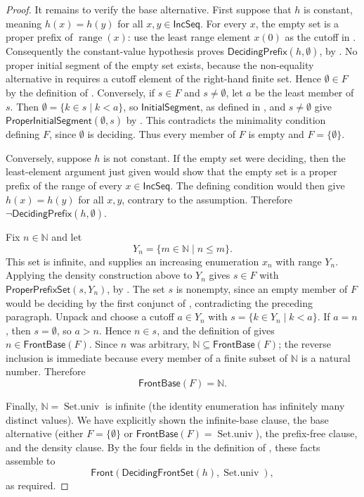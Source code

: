 \begin{proof}
It remains to verify the base alternative.  First suppose that $h$ is
constant, meaning $h(x)=h(y)$ for all $x,y\in\mathsf{IncSeq}$.  For every
$x$, the empty set is a proper prefix of $\operatorname{range}(x)$: use the
least range element $x(0)$ as the cutoff in .
Consequently the constant-value hypothesis proves
 $\mathsf{DecidingPrefix}(h,\emptyset)$, by .  No proper initial segment of the
empty set exists, because the non-equality alternative in
 requires a cutoff element of the right-hand finite
set.  Hence $\emptyset\in F$ by the definition of
.  Conversely, if $s\in F$ and $s\ne\emptyset$,
let $a$ be the least member of $s$.  Then
$\emptyset=\{k\in s\mid k<a\}$, so $\mathsf{InitialSegment}$, as defined
in , and $s\ne\emptyset$ give
$\mathsf{ProperInitialSegment}(\emptyset,s)$ by
.
This contradicts the minimality condition defining $F$, since
$\emptyset$ is deciding.  Thus every member of $F$ is empty and
$F=\{\emptyset\}$.

Conversely, suppose $h$ is not constant.  If the empty set were deciding,
then the least-element argument just given would show that the empty set is
a proper prefix of the range of every $x\in\mathsf{IncSeq}$.  The defining
condition  would then give $h(x)=h(y)$ for all
$x,y$, contrary to the assumption.  Therefore
$\neg\mathsf{DecidingPrefix}(h,\emptyset)$.

Fix $n\in\mathbb N$ and let
\[
 Y_n=\{m\in\mathbb N\mid n\leq m\}.
\]
This set is infinite, and  supplies an
increasing enumeration $x_n$ with range $Y_n$.  Applying the density
construction above to $Y_n$ gives $s\in F$ with
$\mathsf{ProperPrefixSet}(s,Y_n)$, by .  The set $s$ is nonempty, since an empty
member of $F$ would be deciding by the first conjunct of
, contradicting the preceding paragraph.  Unpack
 and choose a cutoff $a\in Y_n$ with
$s=\{k\in Y_n\mid k<a\}$.  If $a=n$, then $s=\emptyset$, so $a>n$.
Hence $n\in s$, and the definition of  gives
$n\in\mathsf{FrontBase}(F)$.  Since $n$ was arbitrary,
$\mathbb N\subseteq\mathsf{FrontBase}(F)$; the reverse inclusion is
immediate because every member of a finite subset of $\mathbb N$ is a
natural number.  Therefore
\[
 \mathsf{FrontBase}(F)=\mathbb N.
\]

Finally, $\mathbb N=\operatorname{Set.univ}$ is infinite (the identity
enumeration has infinitely many distinct values).  We have explicitly shown
the infinite-base clause, the base alternative (either
$F=\{\emptyset\}$ or $\mathsf{FrontBase}(F)=\operatorname{Set.univ}$), the
prefix-free clause, and the density clause.  By the four fields in the
definition of , these facts assemble to
\[
 \mathsf{Front}(\mathsf{DecidingFrontSet}(h),\operatorname{Set.univ}),
\]
as required.
\end{proof}
